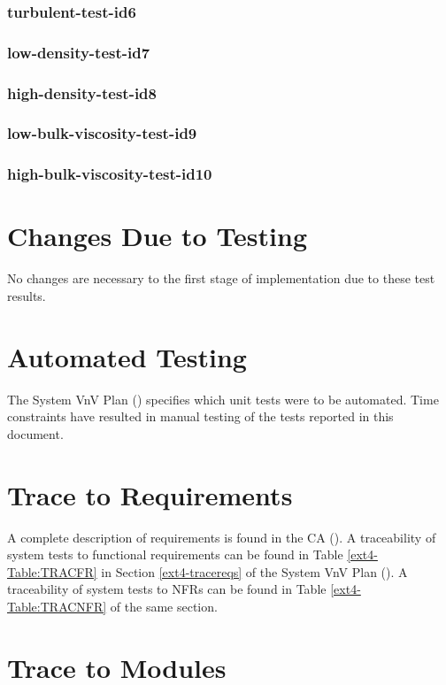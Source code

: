 \documentclass[12pt, titlepage]{article}
\begin{document}
\subsubsection{turbulent-test-id6}
\subsubsection{low-density-test-id7}
\subsubsection{high-density-test-id8}
\subsubsection{low-bulk-viscosity-test-id9}
\subsubsection{high-bulk-viscosity-test-id10}

\section{Changes Due to Testing}
No changes are necessary to the first stage of implementation due to these test results.

\section{Automated Testing}

The System VnV Plan (\citet{LBM_SVNV_PM}) specifies which unit tests were to be automated. Time constraints have resulted in manual testing of the tests reported in this document.
		
\section{Trace to Requirements}
\label{traceabilitytoreq}

A complete description of requirements is found in the CA (\citet{LBM_CA_PM}). A traceability of system tests to functional requirements can be found in Table \ref{ext4-Table:TRACFR} in Section \ref{ext4-tracereqs} of the System VnV Plan (\citet{LBM_SVNV_PM}). A traceability of system tests to NFRs can be found in Table \ref{ext4-Table:TRACNFR} of the same section.

\newpage

		
\section{Trace to Modules}	
\label{modulecoverage}
\end{document}
